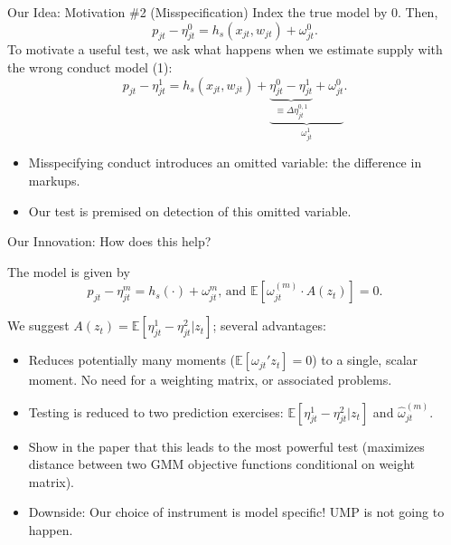 \documentclass[xcolor=pdftex,dvipsnames,table,mathserif,aspectratio=169]{beamer}
\begin{document}
\begin{frame}[plain,label=misspecification]{Our Idea: Motivation \#2 (Misspecification)}
Index the \alert{true} model by $0$. Then,
$$ p_{jt} -\eta^0_{jt}= h_s(x_{jt},w_{jt}) + \omega^0_{jt}.$$
To motivate a useful test, we ask what happens when we estimate supply with the \alert{wrong} conduct model (1):
\pause
$$p_{jt} -\eta_{jt}^1 = h_s(x_{jt},w_{jt}) + \underbrace{\underbrace{\eta^0_{jt} - \eta^1_{jt}}_{\equiv \Delta \eta_{jt}^{0,1}} +  \omega_{jt}^{0}}_{\omega_{jt}^{1}}.$$
\begin{itemize}
\item Misspecifying conduct introduces an omitted variable: the difference in markups.
\item Our test is premised on detection of this omitted variable.
\end{itemize}
\end{frame}


\begin{frame}[plain,label=innovation]{Our Innovation: How does this help?}
\begin{small}
The model is given by
$$p_{jt} - \eta^m_{jt} = h_s(\cdot) +  \omega^m_{jt} \text{,   and  } \mathbb{E}[\omega_{jt}^{(m)}\cdot A(z_t)] = 0.$$

We suggest $A(z_t) = \mathbb{E}[\eta^1_{jt}-\eta_{jt}^2|z_{t}]$; several advantages:
\pause
\begin{itemize}
\item Reduces potentially many moments ($\mathbb{E}[\omega_{jt}' z_t]=0$) to a single, scalar moment. No need for a weighting matrix, or associated problems.
\item Testing is reduced to two prediction exercises: $\mathbb{E}[\eta^1_{jt}-\eta_{jt}^2|z_{t}]$ and $\widehat \omega_{jt}^{(m)}$.
\item Show in the paper that this leads to the most powerful test (maximizes distance between two GMM objective functions conditional on weight matrix).
\item Downside: Our choice of instrument is \alert{model specific}! UMP is not going to happen.
\end{itemize}
\end{small}
\end{frame}
\end{document}
